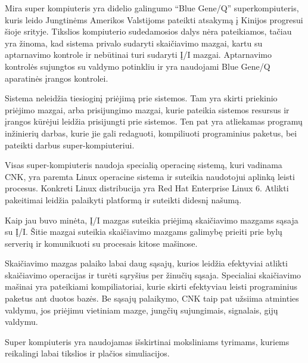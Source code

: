 Mira super kompiuteris yra didelio galingumo ``Blue Gene/Q'' superkompiuteris, kuris leido Jungtinėms Amerikos Valstijoms pateikti atsakymą į Kinijos progresui šioje srityje. Tikslios kompiuterio sudedamosios dalys nėra pateikiamos, tačiau yra žinoma, kad sistema privalo sudaryti skaičiavimo mazgai, kartu su aptarnavimo kontrole ir nebūtinai turi sudaryti Į/I mazgai. Aptarnavimo kontrolės sujungtos su valdymo potinkliu ir yra naudojami Blue Gene/Q aparatinės įrangos kontrolei.

Sistema neleidžia tiesioginį priėjimą prie sistemos. Tam yra skirti priekinio priėjimo mazgai, arba prisijungimo mazgai, kurie pateikia sistemos resursus ir įrangos kūrėjui leidžia prisijungti prie sistemos. Ten pat yra atliekamas programų inžinierių darbas, kurie jie gali redaguoti, kompiliuoti programinius paketus, bei pateikti darbus super-kompiuteriui.

Visas super-kompiuteris naudoja specialią operacinę sistemą, kuri vadinama CNK, yra paremta Linux operacine sistema ir suteikia naudotojui aplinką leisti procesus. Konkreti Linux distribucija yra Red Hat Enterprise Linux 6. Atlikti pakeitimai leidžia palaikyti platformą ir suteikti didesnį našumą.

Kaip jau buvo minėta, Į/I mazgas suteikia priėjimą skaičiavimo mazgams sąsaja su Į/I. Šitie mazgai suteikia skaičiavimo mazgams galimybę prieiti prie bylų serverių ir komunikuoti su procesais kitose mašinose.

Skaičiavimo mazgas palaiko labai daug sąsajų, kurios leidžia efektyviai atlikti skaičiavimo operacijas ir turėti sąryšius per žinučių sąsaja. Specialiai skaičiavimo mašinai yra pateikiami kompiliatoriai, kurie skirti efektyviau leisti programinius paketus ant duotos bazės. Be sąsajų palaikymo, CNK taip pat užsiima atminties valdymu, jos priėjimu vietiniam mazge, jungčių sujungimais, signalais, gijų valdymu.

Super kompiuteris yra naudojamas išskirtinai moksliniams tyrimams, kuriems reikalingi labai tikslios ir plačios simuliacijos.